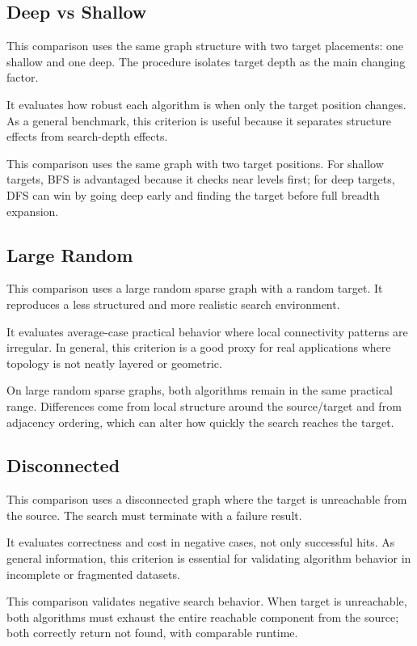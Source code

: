 \documentclass{labreport}
\begin{document}
\subsection{Deep vs Shallow}
This comparison uses the same graph structure with two target placements: one shallow and one deep. The procedure isolates target depth as the main changing factor.

It evaluates how robust each algorithm is when only the target position changes. As a general benchmark, this criterion is useful because it separates structure effects from search-depth effects.


This comparison uses the same graph with two target positions. For shallow targets, BFS is advantaged because it checks near levels first; for deep targets, DFS can win by going deep early and finding the target before full breadth expansion.

\subsection{Large Random}
This comparison uses a large random sparse graph with a random target. It reproduces a less structured and more realistic search environment.

It evaluates average-case practical behavior where local connectivity patterns are irregular. In general, this criterion is a good proxy for real applications where topology is not neatly layered or geometric.


On large random sparse graphs, both algorithms remain in the same practical range. Differences come from local structure around the source/target and from adjacency ordering, which can alter how quickly the search reaches the target.

\subsection{Disconnected}
This comparison uses a disconnected graph where the target is unreachable from the source. The search must terminate with a failure result.

It evaluates correctness and cost in negative cases, not only successful hits. As general information, this criterion is essential for validating algorithm behavior in incomplete or fragmented datasets.


This comparison validates negative search behavior. When target is unreachable, both algorithms must exhaust the entire reachable component from the source; both correctly return not found, with comparable runtime.
\end{document}
